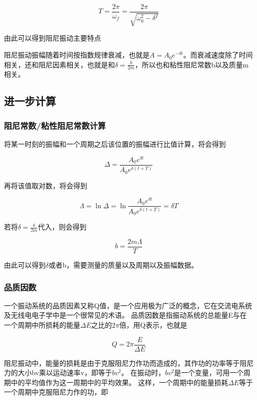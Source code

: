 \documentclass{ctexart}
\begin{document}
  $$T = \frac{2\pi}{\omega_{f}} = \frac{2\pi}{\sqrt{\omega_{0}^{2} - \delta^{2}}}$$

  由此可以得到阻尼振动主要特点

  阻尼振动振幅随着时间按指数规律衰减，也就是$A=A_{0} e^{-\delta t}$。而衰减速度除了时间相关，还和阻尼因素相关，也就是和$\delta=\frac{b}{2m}$，所以也和粘性阻尼常数b以及质量m相关。

  \subsection{进一步计算}
    \subsubsection{阻尼常数/粘性阻尼常数计算}
    将某一时刻的振幅和一个周期之后该位置的振幅进行比值计算，将会得到

    \begin{equation}
      \Delta = \frac{A_{0} e^{\delta t}}{A_{0} e^{\delta (t+T)}}
    \end{equation}

    再将该值取对数，将会得到

    \begin{equation}
      \Lambda = \ln \Delta = \ln \frac{A_{0} e^{\delta t}}{A_{0} e^{\delta (t+T)}} = \delta T
    \end{equation}

    若将$\delta = \frac{b}{2m}$代入，则会得到

    \begin{equation}
      b = \frac{2m\Lambda}{T}
    \end{equation}

    由此可以得到$\delta$或者b，需要测量的质量以及周期以及振幅数据。

    \subsubsection{品质因数}
    一个振动系统的品质因素又称Q值，是一个应用极为广泛的概念，它在交流电系统及无线电电子学中是一个很常见的术语。
    品质因数是指振动系统的总能量E与在一个周期中所损耗的能量$\Delta E$之比的$2\pi$倍，用Q表示，也就是

    \begin{equation}
      Q=2\pi \frac{E}{\Delta E}
    \end{equation}

    阻尼振动中，能量的损耗是由于克服阻尼力作功而造成的，其作功的功率等于阻尼力的大小bv乘以运动速率v，即等于$bv^{2}$。
    在振动时，$bv^{2}$是一个变量，可用一个周期中的平均值作为这一周期中的平均效果。
    这样，一个周期中的能量损耗$\Delta E$等于一个周期中克服阻尼力作的功，即
\end{document}
